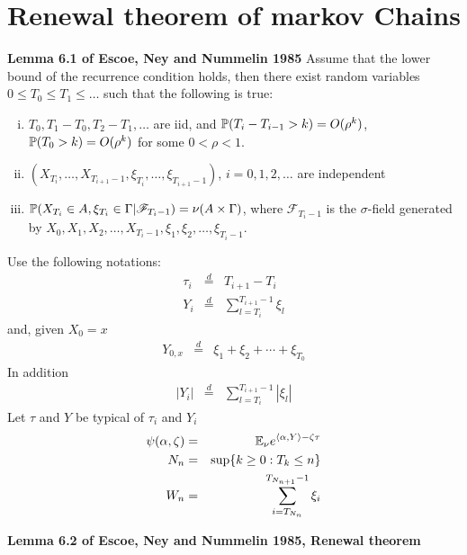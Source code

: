 \documentclass[12pt]{article}
\begin{document}
\section{Renewal theorem of markov Chains}
{\bf Lemma 6.1 of Escoe, Ney and Nummelin 1985}
Assume that the lower bound of the recurrence condition holds, then
there exist random variables $0 \leq T_0 \leq T_1 \leq \dots$ such
that the following is true:
\begin{enumerate}[(i)]
\item $T_0, T_1 - T_0, T_2 - T_1, \dots$ are iid, and $\P(T_i -
  T_{i-1} > k) = O(\rho^k)$, $\P(T_0 > k) = O(\rho^k)$ for some $0 <
  \rho < 1$.
\item $(X_{T_i}, \dots, X_{T_{i+1} - 1}, \xi_{T_i}, \dots,
  \xi_{T_{i+1} - 1})$, $i=0, 1, 2, \dots$ are independent
\item $\P(X_{T_i} \in A, \xi_{T_i} \in \Gamma | \mathscr F_{T_i-1}) =
  \nu(A \times \Gamma)$, where $\mathscr F_{T_i-1}$ is the
  $\sigma$-field generated by $X_0, X_1, X_2, \dots, X_{T_i-1}, \xi_1,
  \xi_2, \dots, \xi_{T_i-1}$.
\end{enumerate}
Use the following notations:
\begin{eqnarray*}
  \tau_i &\overset{d}{=}& T_{i+1} - T_i \\
  Y_i &\overset{d}{=}& \sum_{l=T_i}^{T_{i+1}-1} \xi_l
\end{eqnarray*}
and, given $X_0 = x$
\begin{eqnarray*}
  Y_{0, x} &\overset{d}{=}& \xi_1 + \xi_2 + \cdots + \xi_{T_0}
\end{eqnarray*}
In addition
\begin{eqnarray*}
  |Y_i| &\overset{d}{=}& \sum_{l=T_i}^{T_{i+1}-1} |\xi_l|
\end{eqnarray*}
Let $\tau$ and $Y$ be typical of $\tau_i$ and $Y_i$
\begin{eqnarray*}
  \psi(\alpha, \zeta) &=& \E_{\nu} e^{\inn{\alpha, Y} - \zeta \tau} \\  
  N_n &=& \sup\{k \geq 0: T_k \leq n\} \\
  W_n &=& \sum_{i=T_{N_n}}^{T_{N_{n+1}} - 1} \xi_i
\end{eqnarray*}

{\bf Lemma 6.2 of Escoe, Ney and Nummelin 1985, Renewal theorem}


\end{document}
